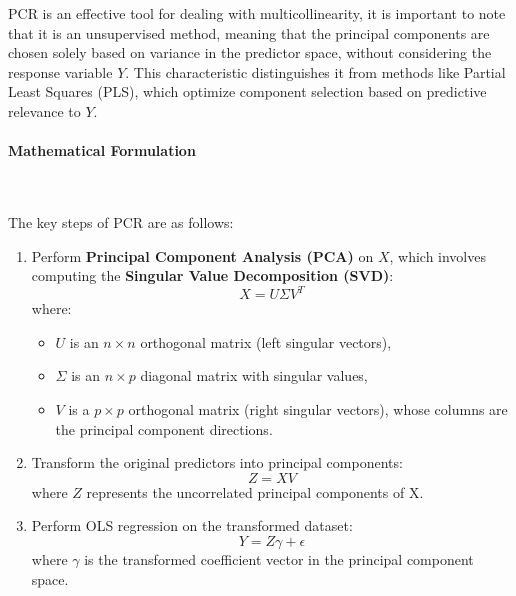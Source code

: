 \documentclass[11pt,twoside,a4paper]{article}
\begin{document}
PCR is an effective tool for dealing with multicollinearity, it is important to note that it is an unsupervised method, meaning that the principal components are chosen solely based on variance in the predictor space, without considering the response variable \( Y \). This characteristic distinguishes it from methods like Partial Least Squares (PLS), which optimize component selection based on predictive relevance to \( Y \).

\newpage
\paragraph{Mathematical Formulation} \ \

The key steps of PCR are as follows:

\begin{enumerate}
    \item Perform \textbf{Principal Component Analysis (PCA)} on \( X \), which involves computing the \textbf{Singular Value Decomposition (SVD)}:
   \begin{equation}
    X = U \Sigma V^T
    \end{equation}
    where:
    \begin{itemize}
        \item \( U \) is an \( n \times n \) orthogonal matrix (left singular vectors),
        \item \( \Sigma \) is an \( n \times p \) diagonal matrix with singular values,
        \item \( V \) is a \( p \times p \) orthogonal matrix (right singular vectors), whose columns are the principal component directions.
    \end{itemize}
    
    \item Transform the original predictors into principal components:
    \begin{equation}
    Z = X V
    \end{equation}
    where  \( Z \) represents the uncorrelated principal components of X.
 
    \item Perform OLS regression on the transformed dataset:
    \begin{equation}
    Y = Z \gamma + \epsilon
    \end{equation}
    where \( \gamma \) is the transformed coefficient vector in the principal component space.
  \end{enumerate}
  
\end{document}
